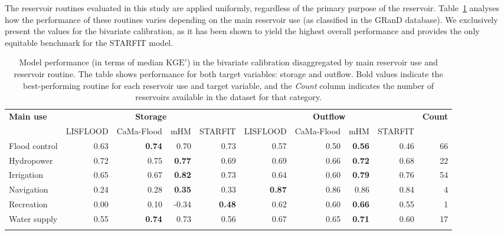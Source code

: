 \documentclass[hess, manuscript]{copernicus}
\newcommand{\KGEmod}{$\text{KGE}'$}
\begin{document}
The reservoir routines evaluated in this study are applied uniformly, regardless of the primary purpose of the reservoir. Table~\ref{tab:kge_use} analyses how the performance of these routines varies depending on the main reservoir use (as classified in the GRanD database). We exclusively present the values for the bivariate calibration, as it has been shown to yield the highest overall performance and provides the only equitable benchmark for the STARFIT model.

\begin{table}[t]
    \centering
    \small
    \caption{Model performance (in terms of median \KGEmod) in the bivariate calibration disaggregated by main reservoir use and reservoir routine. The table shows performance for both target variables: storage and outflow. Bold values indicate the best-performing routine for each reservoir use and target variable, and the \textit{Count} column indicates the number of reservoirs available in the dataset for that category.}
    \begin{tabular}{l rrrr @{\hspace{0.7cm}} rrrr @{\hspace{0.7cm}} r}
        \tophline
         \textbf{Main use}  & \multicolumn{4}{c}{\textbf{Storage}} & \multicolumn{4}{c}{\textbf{Outflow}} & \textbf{Count}\\
          & LISFLOOD & CaMa-Flood & mHM & STARFIT & LISFLOOD & CaMa-Flood & mHM & STARFIT & \\
         \middlehline
        Flood control & 0.63 & \textbf{0.74} & 0.70 & 0.73 & 0.57 & 0.50 & \textbf{0.56} & 0.46 & 66 \\
        Hydropower    & 0.72 & 0.75 & \textbf{0.77} & 0.69 & 0.69 & 0.66 & \textbf{0.72} & 0.68 & 22 \\
        Irrigation    & 0.65 & 0.67 & \textbf{0.82} & 0.73 & 0.64 & 0.60 & \textbf{0.79} & 0.76 & 54 \\
        Navigation    & 0.24 & 0.28 & \textbf{0.35} & 0.33 & \textbf{0.87} & 0.86 & 0.86 & 0.84 & 4  \\
        Recreation    & 0.00 & 0.10 & -0.34 & \textbf{0.48} & 0.62 & 0.60 & \textbf{0.66} & 0.55 & 1  \\
        Water supply  & 0.55 & \textbf{0.74} & 0.73 & 0.56 & 0.67 & 0.65 & \textbf{0.71} & 0.60 & 17 \\
        \bottomhline
    \end{tabular}
    \label{tab:kge_use}
\end{table}
\end{document}
